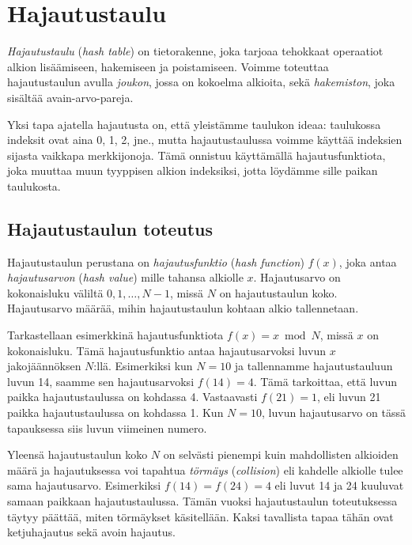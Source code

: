 \chapter{Hajautustaulu}


\emph{Hajautustaulu} (\emph{hash table}) on tietorakenne,
joka tarjoaa tehokkaat operaatiot alkion lisäämiseen,
hakemiseen ja poistamiseen.
Voimme toteuttaa hajautustaulun avulla \emph{joukon},
jossa on kokoelma alkioita, sekä \emph{hakemiston},
joka sisältää avain-arvo-pareja.

Yksi tapa ajatella hajautusta on, että yleistämme taulukon ideaa:
taulukossa indeksit ovat aina 0, 1, 2, jne., mutta hajautustaulussa
voimme käyttää indeksien sijasta vaikkapa merkkijonoja.
Tämä onnistuu käyttämällä hajautusfunktiota,
joka muuttaa muun tyyppisen alkion indeksiksi,
jotta löydämme sille paikan taulukosta.

\section{Hajautustaulun toteutus}


Hajautustaulun perustana on \emph{hajautusfunktio}
(\emph{hash function}) $f(x)$,
joka antaa \emph{hajautusarvon} (\emph{hash value})
mille tahansa alkiolle $x$.
Hajautusarvo on kokonaisluku väliltä $0,1,\dots,N-1$,
missä $N$ on hajautustaulun koko.
Hajautusarvo määrää, mihin hajautustaulun kohtaan
alkio tallennetaan.

Tarkastellaan esimerkkinä hajautusfunktiota $f(x)=x \bmod N$,
missä $x$ on kokonaisluku.
Tämä hajautusfunktio antaa hajautusarvoksi luvun $x$
jakojäännöksen $N$:llä.
Esimerkiksi kun $N=10$ ja tallennamme hajautustauluun luvun 14,
saamme sen hajautusarvoksi $f(14)=4$.
Tämä tarkoittaa, että luvun paikka hajautustaulussa on kohdassa 4.
Vastaavasti $f(21)=1$, eli luvun 21 paikka hajautustaulussa on
kohdassa 1.
Kun $N=10$, luvun hajautusarvo on tässä tapauksessa siis
luvun viimeinen numero.


Yleensä hajautustaulun koko $N$ on selvästi pienempi kuin
mahdollisten alkioiden määrä ja
hajautuksessa voi tapahtua \emph{törmäys} (\emph{collision})
eli kahdelle alkiolle tulee sama hajautusarvo.
Esimerkiksi $f(14)=f(24)=4$ eli luvut 14 ja 24 kuuluvat
samaan paikkaan hajautustaulussa.
Tämän vuoksi hajautustaulun toteutuksessa täytyy päättää,
miten tör\-mäykset käsitellään.
Kaksi tavallista tapaa tähän ovat ketjuhajautus sekä avoin hajautus.

